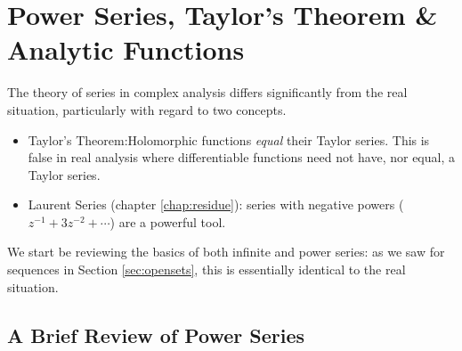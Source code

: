 \graphicspath{{5series/asy/}}

\section[Power Series]{Power Series, Taylor's Theorem \& Analytic Functions}\label{chap:powerseries}

The theory of series in complex analysis differs significantly from the real situation, particularly with regard to two concepts.
\begin{itemize}
  \item Taylor's Theorem:\quad Holomorphic functions \emph{equal} their Taylor series. This is false in real analysis where differentiable functions need not have, nor equal, a Taylor series.
  \item Laurent Series (chapter \ref{chap:residue}): series with negative powers ($z^{-1}+3z^{-2}+\cdots$) are a powerful tool.
\end{itemize}

We start be reviewing the basics of both infinite and power series: as we saw for sequences in Section \ref{sec:opensets}, this is essentially identical to the real situation.


\subsection{A Brief Review of Power Series}\label{sec:powerreview}


